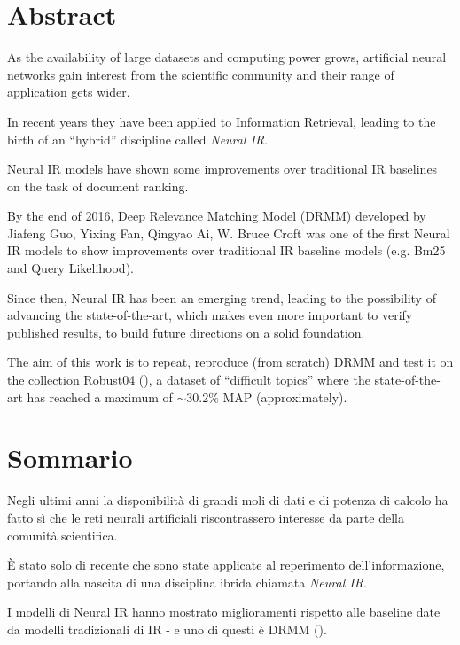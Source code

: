 \cleardoublepage
{}
\section*{Abstract}
\thispagestyle{empty}

As the availability of large datasets and computing power grows, artificial neural networks gain interest from the scientific community and their range of application gets wider.

In recent years they have been applied to Information Retrieval, leading to the birth of an ``hybrid'' discipline called \textit{Neural IR}.

Neural IR models have shown some improvements over traditional IR baselines on the task of document ranking.

By the end of 2016, Deep Relevance Matching Model (DRMM) developed by Jiafeng Guo, Yixing Fan, Qingyao Ai, W. Bruce Croft was one of the first Neural IR models to show improvements over traditional IR baseline models (e.g. Bm25 and Query Likelihood).

Since then, Neural IR has been an emerging trend, leading to the possibility of advancing the state-of-the-art, which makes even more important to verify published results, to build future directions on a solid foundation.

The aim of this work is to repeat, reproduce (from scratch) DRMM and test it on the collection Robust04 (\cite{rob04}), a dataset of ``difficult topics'' where the state-of-the-art has reached a maximum of $ \sim 30.2\%$ MAP (approximately).

\bigskip

\cleardoublepage
\section*{Sommario}
\thispagestyle{empty}

Negli ultimi anni la disponibilità di grandi moli di dati e di potenza di calcolo ha fatto sì che le reti neurali artificiali riscontrassero interesse da parte della comunità scientifica.

È stato solo di recente che sono state applicate al reperimento dell'informazione, portando alla nascita di una disciplina ibrida chiamata \textit{Neural IR}.

I modelli di Neural IR hanno mostrato miglioramenti rispetto alle baseline date da modelli tradizionali di IR - e uno di questi è DRMM (\cite{drmm}).

